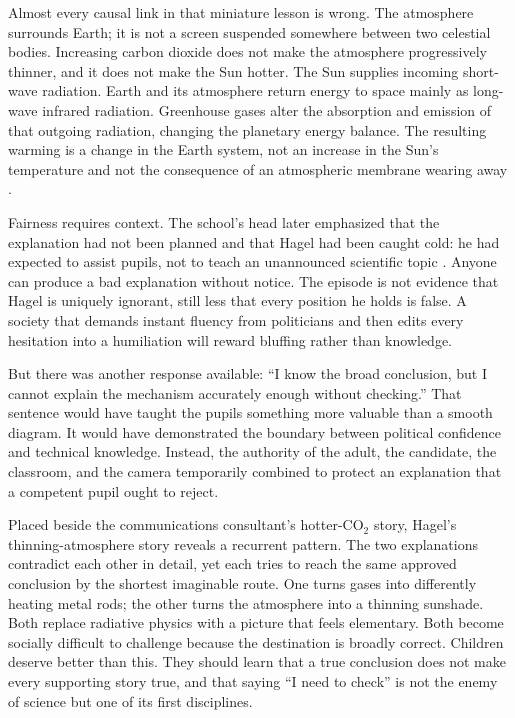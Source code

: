 ﻿\documentclass[12pt,a4paper]{book}
\begin{document}
Almost every causal link in that miniature lesson is wrong.  The atmosphere
surrounds Earth; it is not a screen suspended somewhere between two celestial
bodies.  Increasing carbon dioxide does not make the atmosphere progressively
thinner, and it does not make the Sun hotter.  The Sun supplies incoming
short-wave radiation.  Earth and its atmosphere return energy to space mainly
as long-wave infrared radiation.  Greenhouse gases alter the absorption and
emission of that outgoing radiation, changing the planetary energy balance.
The resulting warming is a change in the Earth system, not an increase in the
Sun's temperature and not the consequence of an atmospheric membrane wearing
away \cite{IPCC2021HumanInfluence}.

Fairness requires context.  The school's head later emphasized that the
explanation had not been planned and that Hagel had been caught cold: he had
expected to assist pupils, not to teach an unannounced scientific topic
\cite{WittmerHagelSchool2026}.  Anyone can produce a bad explanation without
notice.  The episode is not evidence that Hagel is uniquely ignorant, still
less that every position he holds is false.  A society that demands instant
fluency from politicians and then edits every hesitation into a humiliation
will reward bluffing rather than knowledge.

But there was another response available: ``I know the broad conclusion, but
I cannot explain the mechanism accurately enough without checking.''  That
sentence would have taught the pupils something more valuable than a smooth
diagram.  It would have demonstrated the boundary between political confidence
and technical knowledge.  Instead, the authority of the adult, the candidate,
the classroom, and the camera temporarily combined to protect an explanation
that a competent pupil ought to reject.

Placed beside the communications consultant's hotter-CO$_2$ story, Hagel's
thinning-atmosphere story reveals a recurrent pattern.  The two explanations
contradict each other in detail, yet each tries to reach the same approved
conclusion by the shortest imaginable route.  One turns gases into differently
heating metal rods; the other turns the atmosphere into a thinning sunshade.
Both replace radiative physics with a picture that feels elementary.  Both
become socially difficult to challenge because the destination is broadly
correct.  Children deserve better than this.  They should learn that a true
conclusion does not make every supporting story true, and that saying ``I need
to check'' is not the enemy of science but one of its first disciplines.
\end{document}
